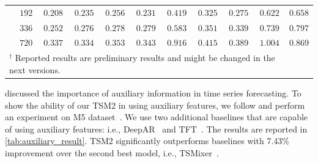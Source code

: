 \documentclass{article}
\newcommand{\head}[1]{\vspace{1.7mm}\noindent{{\textcolor{c1}{\bf #1.}}}}
\begin{document}
\begin{table}
{\begin{tabular}{ccccccccccc}
& $192$ & \cellcolor{myblue}$\mathbf{0.208}$ & ${0.235}$  & $0.256$ & \cellcolor{mygray}$0.231$ & $0.419$ & $0.325$ & $0.275$ & $0.622$ & $0.658$\\
& $336$ & \cellcolor{myblue}$\mathbf{0.252}$ & \cellcolor{mygray}${0.276}$ & $0.278$ & $0.279$ & $0.583$ & $0.351$ & $0.339$ & $0.739$ & $0.797$\\ 
& $720$ & \cellcolor{mygray}${0.337}$ & \cellcolor{myblue}$\mathbf{0.334}$  & $0.353$ & $0.343$ & $0.916$ & $0.415$ & $0.389$& $1.004$ &$ 0.869$\\
\bottomrule
\multicolumn{10}{l}{$^\dagger$ Reported results are preliminary results and might be changed in the next versions.}
\end{tabular}
}
\end{table}











\head{Forecasting with Auxiliary Information}
\citet{chen2023tsmixer} discussed the importance of auxiliary information in time series forecasting. To show the ability of our TSM2 in using auxiliary features, we follow \citet{chen2023tsmixer} and perform an experiment on M5 dataset~\citep{makridakis2022m5}. We use two additional baselines that are capable of using auxiliary features: i.e., DeepAR~\citep{salinas2020deepar} and TFT~\citep{lim2021temporal}. The results are reported in \autoref{tab:auxiliary_result}. TSM2 significantly outperforms baselines with 7.43\% improvement over the second best model, i.e., TSMixer~\citep{chen2023tsmixer}.
\end{document}
